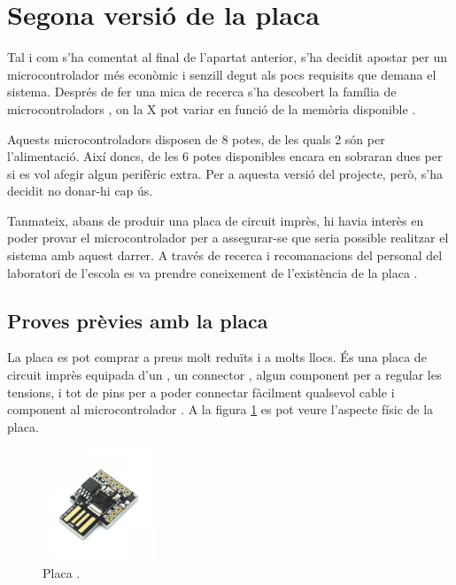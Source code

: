 \section{Segona versió de la placa}

Tal i com s'ha comentat al final de l'apartat anterior, s'ha decidit apostar
per un microcontrolador més econòmic i senzill degut als pocs requisits que
demana el sistema. Després de fer una mica de recerca s'ha descobert la
família de microcontroladors , on la X pot variar en funció de
la memòria  disponible \cite{AtTiny85}.

Aquests microcontroladors disposen de 8 potes, de les quals 2 són per
l'alimentació. Així doncs, de les 6 potes disponibles encara en sobraran dues
per si es vol afegir algun perifèric extra. Per a aquesta versió del projecte,
però, s'ha decidit no donar-hi cap ús.

Tanmateix, abans de produir una placa de circuit imprès, hi havia interès en
poder provar el microcontrolador per a assegurar-se que seria possible
realitzar el sistema amb aquest darrer. A través de recerca i recomanacions del
personal del laboratori de l'escola es va prendre coneixement de l'existència de
la placa .

\subsection{Proves prèvies amb la placa }
\label{subsec:hw_digispark}

La placa  es pot comprar a preus molt reduïts i a molts llocs.
És una placa de circuit imprès equipada d'un , un connector
, algun component per a regular les tensions, i tot de pins per a
poder connectar fàcilment qualsevol cable i component al microcontrolador
\cite{Digispark}. A la figura \ref{fig:digispark} es pot veure l'aspecte físic
de la placa.

\begin{figure}[ht]
    \centering
    \includegraphics[width=0.3\textwidth]{images/modules/digisparkimg.png}
    \caption{Placa  \cite{Digispark}.}
    \label{fig:digispark}
\end{figure}

